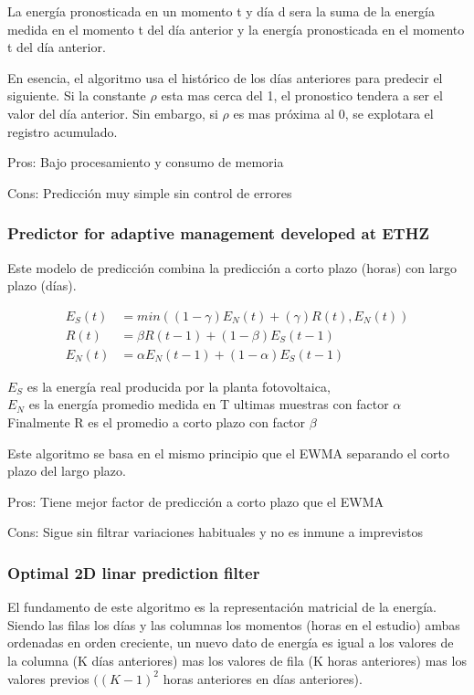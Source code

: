 La energía pronosticada en un momento t y día d sera la suma de la energía medida en el momento t del día anterior y la energía pronosticada en el momento t del día anterior.

En esencia, el algoritmo usa el histórico de los días anteriores para predecir el siguiente. Si la constante $\rho$ esta mas cerca del 1, el pronostico tendera a ser el valor del día anterior. Sin embargo, si $\rho$ es mas próxima al 0, se explotara el registro acumulado. 

Pros: Bajo procesamiento y consumo de memoria

Cons: Predicción muy simple sin control de errores


\subsubsection{ Predictor for adaptive management developed at ETHZ } 
\label{ssub:subsubsection_name}

Este modelo \cite{ethz} de predicción combina la predicción a corto plazo (horas) con largo plazo (días).

\begin{align}
	E_S(t) &= min( (1-\gamma) E_N(t) + (\gamma) R(t), E_N(t) ) \\
	R(t) &= \beta R(t-1) + (1-\beta) E_S(t-1) \\
	E_N(t) &= \alpha E_N(t-1) + (1-\alpha) E_S(t-1)
\end{align}

$E_S$ es la energía real producida por la planta fotovoltaica,\\
$E_N$ es la energía promedio medida en T ultimas muestras con factor $\alpha$
Finalmente R es el promedio a corto plazo con factor $\beta$

Este algoritmo se basa en el mismo principio que el EWMA separando el corto plazo del largo plazo.

Pros: Tiene mejor factor de predicción a corto plazo que el EWMA

Cons: Sigue sin filtrar variaciones habituales y no es inmune a imprevistos


\subsubsection{ Optimal 2D linar prediction filter } 
\label{ssub:subsubsection_name}

El fundamento de este algoritmo \cite{o2d} es la representación matricial de la energía. Siendo las filas los días y las columnas los momentos (horas en el estudio) ambas ordenadas en orden creciente, un nuevo dato de energía es igual a los valores de la columna (K días anteriores) mas los valores de fila (K horas anteriores) mas los valores previos $((K-1)^2$ horas anteriores en días anteriores).

